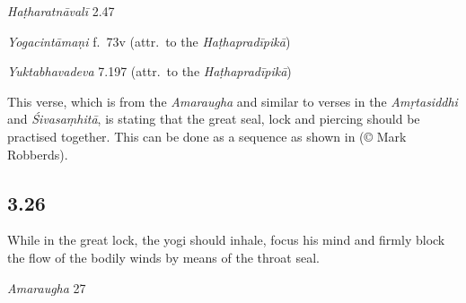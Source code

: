 \begin{ekdosis}
\begin{testimonia}[hp03_025]
\emph{Haṭharatnāvalī} 2.47
\begin{versinnote}
\tl{\var{°mahābandhau ] mahābandho \vl}\\!}
\end{versinnote}

\emph{Yogacintāmaṇi} f.~73v (attr.~to the \emph{Haṭhapradīpikā})
\begin{versinnote}
\end{versinnote}

\emph{Yuktabhavadeva} 7.197 (attr.~to the \emph{Haṭhapradīpikā})
\begin{versinnote}
\end{versinnote}
\end{testimonia}

\begin{philcomm}[hp03_025]
This verse, which is from the \emph{Amaraugha} and similar to verses in the \emph{Amṛtasiddhi} and \emph{Śivasaṃhitā}, is stating that the great seal, lock and piercing should be practised together. This can be done as a sequence as shown in  (© Mark Robberds).
\end{philcomm}

\subsection*{3.26}
\begin{translation}[hp03_026]
While in the great lock, the yogi should inhale, focus his mind and firmly block the flow of the bodily winds by means of the throat seal.
\end{translation}

\begin{sources}[hp03_026]
\emph{Amaraugha} 27
\begin{versinnote}
\tl{\var{ārudhya ] āvṛtya, āśritya \vl}\\!}
\end{versinnote}


\end{sources}
\end{ekdosis}
